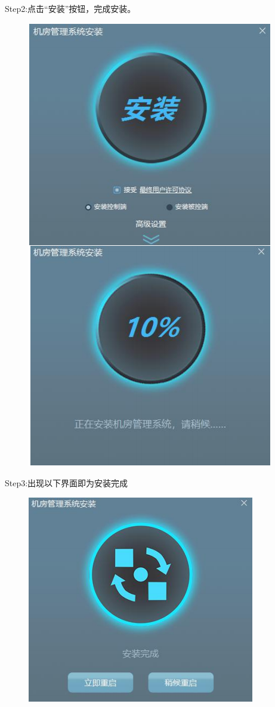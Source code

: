 \documentclass[openbib]{article}
\begin{document}
Step2:点击“安装”按钮，完成安装。
\begin{figure}[H]
	\centering
	\includegraphics[scale=0.3]{系统安装1}
\end{figure}

Step3:出现以下界面即为安装完成
\begin{figure}[htbp]
	\centering
	\includegraphics[scale=0.3]{系统安装2}
\end{figure}
\end{document}
